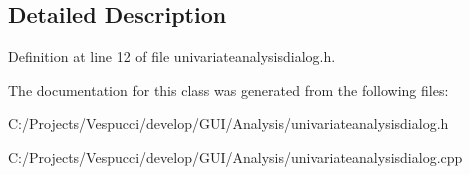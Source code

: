 \subsection{Detailed Description}


Definition at line 12 of file univariateanalysisdialog.\+h.



The documentation for this class was generated from the following files\+:\begin{DoxyCompactItemize}
\item 
C\+:/\+Projects/\+Vespucci/develop/\+G\+U\+I/\+Analysis/univariateanalysisdialog.\+h\item 
C\+:/\+Projects/\+Vespucci/develop/\+G\+U\+I/\+Analysis/univariateanalysisdialog.\+cpp\end{DoxyCompactItemize}
